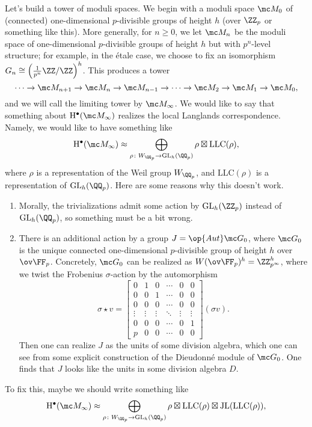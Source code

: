 \documentclass[../notes.tex]{subfiles}
\begin{document}
Let's build a tower of moduli spaces. We begin with a moduli space $\mc M_0$ of (connected) one-dimensional $p$-divisible groups of height $h$ (over $\ZZ_p$ or something like this). More generally, for $n\ge0$, we let $\mc M_n$ be the moduli space of one-dimensional $p$-divisible groups of height $h$ but with $p^n$-level structure; for example, in the \'etale case, we choose to fix an isomorphism $G_n\cong\left(\frac1{p^n}\ZZ/\ZZ\right)^h$. This produces a tower
\[\cdots\to\mc M_{n+1}\to\mc M_n\to\mc M_{n-1}\to\cdots\to\mc M_2\to\mc M_1\to\mc M_0,\]
and we will call the limiting tower by $\mc M_\infty$. We would like to say that something about $\mathrm H^\bullet(\mc M_\infty)$ realizes the local Langlands correspondence. Namely, we would like to have something like
\[\mathrm H^\bullet(\mc M_\infty)\approx\bigoplus_{\rho\colon W_{\QQ_p}\to\mathrm{GL}_h(\QQ_p)}\rho\boxtimes\mathrm{LLC}(\rho),\]
where $\rho$ is a representation of the Weil group $W_{\QQ_p}$, and $\mathrm{LLC}(\rho)$ is a representation of $\mathrm{GL}_h(\QQ_p)$. Here are some reasons why this doesn't work.
\begin{enumerate}[label=(\roman*)]
	\item Morally, the trivializations admit some action by $\mathrm{GL}_h(\ZZ_p)$ instead of $\mathrm{GL}_h(\QQ_p)$, so something must be a bit wrong.
	\item There is an additional action by a group $J=\op{Aut}\mc G_0$, where $\mc G_0$ is the unique connected one-dimensional $p$-divisible group of height $h$ over $\ov\FF_p$. Concretely, $\mc G_0$ can be realized as $W(\ov\FF_p)^h=\ZZ_{p^\infty}^h$, where we twist the Frobenius $\sigma$-action by the automorphism
	\[\sigma\star v=\begin{bmatrix}
		0 & 1 & 0 & \cdots & 0 & 0 \\
		0 & 0 & 1 & \cdots & 0 & 0 \\
		0 & 0 & 0 & \cdots & 0 & 0 \\
		\vdots & \vdots & \vdots & \ddots & \vdots & \vdots \\
		0 & 0 & 0 & \cdots & 0 & 1 \\
		p & 0 & 0 & \cdots & 0 & 0
	\end{bmatrix}(\sigma v).\]
	Then one can realize $J$ as the units of some division algebra, which one can see from some explicit construction of the Dieudonn\'e module of $\mc G_0$. One finds that $J$ looks like the units in some division algebra $D$.
\end{enumerate}
To fix this, maybe we should write something like
\[\mathrm H^\bullet(\mc M_\infty)\approx\bigoplus_{\rho\colon W_{\QQ_p}\to\mathrm{GL}_h(\QQ_p)}\rho\boxtimes\mathrm{LLC}(\rho)\boxtimes\mathrm{JL}(\mathrm{LLC}(\rho)),\]
\end{document}
